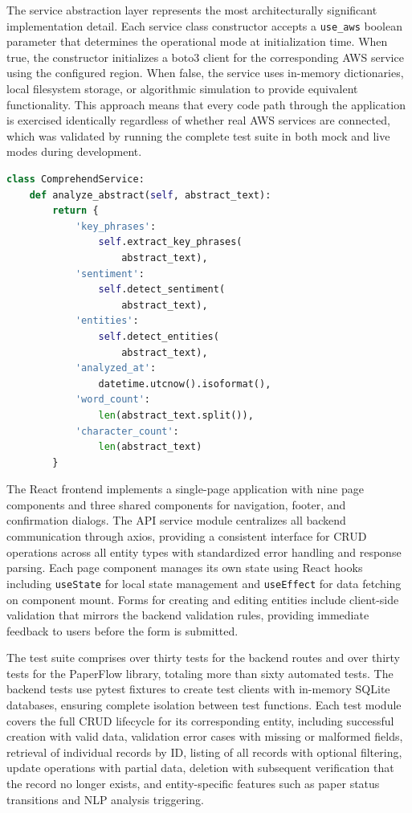 \documentclass[conference]{IEEEtran}
\begin{document}
The service abstraction layer represents the most architecturally significant implementation detail. Each service class constructor accepts a \texttt{use\_aws} boolean parameter that determines the operational mode at initialization time. When true, the constructor initializes a boto3 client for the corresponding AWS service using the configured region. When false, the service uses in-memory dictionaries, local filesystem storage, or algorithmic simulation to provide equivalent functionality. This approach means that every code path through the application is exercised identically regardless of whether real AWS services are connected, which was validated by running the complete test suite in both mock and live modes during development.

\begin{lstlisting}[language=Python, caption={Comprehend service NLP analysis}]
class ComprehendService:
    def analyze_abstract(self, abstract_text):
        return {
            'key_phrases':
                self.extract_key_phrases(
                    abstract_text),
            'sentiment':
                self.detect_sentiment(
                    abstract_text),
            'entities':
                self.detect_entities(
                    abstract_text),
            'analyzed_at':
                datetime.utcnow().isoformat(),
            'word_count':
                len(abstract_text.split()),
            'character_count':
                len(abstract_text)
        }
\end{lstlisting}

The React frontend implements a single-page application with nine page components and three shared components for navigation, footer, and confirmation dialogs. The API service module centralizes all backend communication through axios, providing a consistent interface for CRUD operations across all entity types with standardized error handling and response parsing. Each page component manages its own state using React hooks including \texttt{useState} for local state management and \texttt{useEffect} for data fetching on component mount. Forms for creating and editing entities include client-side validation that mirrors the backend validation rules, providing immediate feedback to users before the form is submitted.

The test suite comprises over thirty tests for the backend routes and over thirty tests for the PaperFlow library, totaling more than sixty automated tests. The backend tests use pytest fixtures to create test clients with in-memory SQLite databases, ensuring complete isolation between test functions. Each test module covers the full CRUD lifecycle for its corresponding entity, including successful creation with valid data, validation error cases with missing or malformed fields, retrieval of individual records by ID, listing of all records with optional filtering, update operations with partial data, deletion with subsequent verification that the record no longer exists, and entity-specific features such as paper status transitions and NLP analysis triggering.
\end{document}
